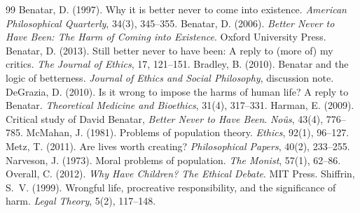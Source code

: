 \documentclass{situationist-preprint}
\begin{document}
\begin{thebibliography}{99}\small
{} Benatar, D. (1997). Why it is better never to come into existence. \emph{American Philosophical Quarterly}, 34(3), 345--355.
 Benatar, D. (2006). \emph{Better Never to Have Been: The Harm of Coming into Existence}. Oxford University Press.
 Benatar, D. (2013). Still better never to have been: A reply to (more of) my critics. \emph{The Journal of Ethics}, 17, 121--151.
 Bradley, B. (2010). Benatar and the logic of betterness. \emph{Journal of Ethics and Social Philosophy}, discussion note.
 DeGrazia, D. (2010). Is it wrong to impose the harms of human life? A reply to Benatar. \emph{Theoretical Medicine and Bioethics}, 31(4), 317--331.
 Harman, E. (2009). Critical study of David Benatar, \emph{Better Never to Have Been}. \emph{No\^us}, 43(4), 776--785.
 McMahan, J. (1981). Problems of population theory. \emph{Ethics}, 92(1), 96--127.
 Metz, T. (2011). Are lives worth creating? \emph{Philosophical Papers}, 40(2), 233--255.
 Narveson, J. (1973). Moral problems of population. \emph{The Monist}, 57(1), 62--86.
 Overall, C. (2012). \emph{Why Have Children? The Ethical Debate}. MIT Press.
 Shiffrin, S.~V. (1999). Wrongful life, procreative responsibility, and the significance of harm. \emph{Legal Theory}, 5(2), 117--148.
\end{thebibliography}
\end{document}

